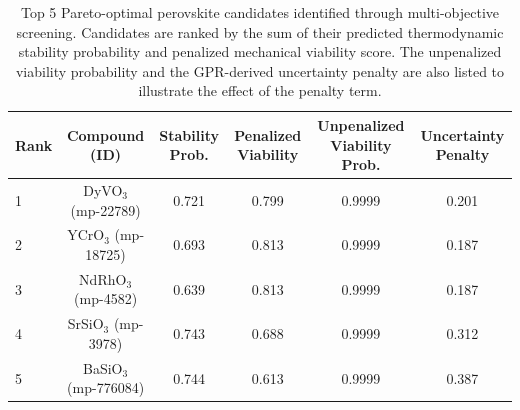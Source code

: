 \documentclass[]{article}
\begin{document}
\begin{table}[t]
\centering
\caption{Top 5 Pareto-optimal perovskite candidates identified through multi-objective screening. Candidates are ranked by the sum of their predicted thermodynamic stability probability and penalized mechanical viability score. The unpenalized viability probability and the GPR-derived uncertainty penalty are also listed to illustrate the effect of the penalty term.}
\label{tab:candidates}
\begin{tabular}{lccccc}
\hline
\hline
Rank & Compound (ID) & Stability Prob. & Penalized Viability & Unpenalized Viability Prob. & Uncertainty Penalty \\
\hline
1 & DyVO$_3$ (mp-22789) & 0.721 & 0.799 & 0.9999 & 0.201 \\
2 & YCrO$_3$ (mp-18725) & 0.693 & 0.813 & 0.9999 & 0.187 \\
3 & NdRhO$_3$ (mp-4582) & 0.639 & 0.813 & 0.9999 & 0.187 \\
4 & SrSiO$_3$ (mp-3978) & 0.743 & 0.688 & 0.9999 & 0.312 \\
5 & BaSiO$_3$ (mp-776084) & 0.744 & 0.613 & 0.9999 & 0.387 \\
\hline
\end{tabular}
\end{table}
\end{document}
